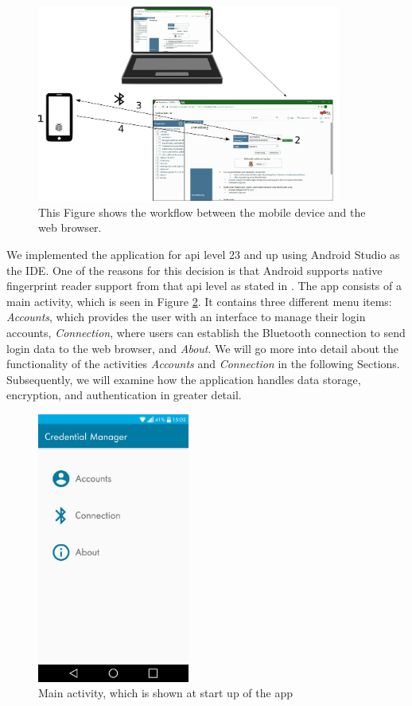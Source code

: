 \vspace{0.3cm}
\begin{figure}[!htb]
    \centering
    \includegraphics[width=10cm]{images/Communication.png}
    \caption[Workflow between Devices]{This Figure shows the workflow between the mobile device and the web browser.}
    \label{fig:comm}
\end{figure}
\vspace{0.3cm}



\noindent We implemented the application for \gls{api} level 23 and up using Android Studio as the IDE. One of the reasons for this decision is that Android supports native fingerprint reader support from that \gls{api} level as stated in \cite{AndroidM}. The app consists of a main activity, which is seen in Figure \ref{fig:mainactivity}. It contains three different menu items: \textit{Accounts}, which provides the user with an interface to manage their login accounts, \textit{Connection}, where users can establish the Bluetooth connection to send login data to the web browser, and \textit{About}. We will go more into detail about the functionality of the activities \textit{Accounts} and \textit{Connection} in the following Sections. Subsequently, we will examine how the application handles data storage, encryption, and authentication in greater detail.

\begin{figure}[!htb]
\centering
\includegraphics[width=5cm]{images/MainActivityNew}
\caption[Main Activity]{Main activity, which is shown at start up of the app}
\label{fig:mainactivity}
\end{figure}

